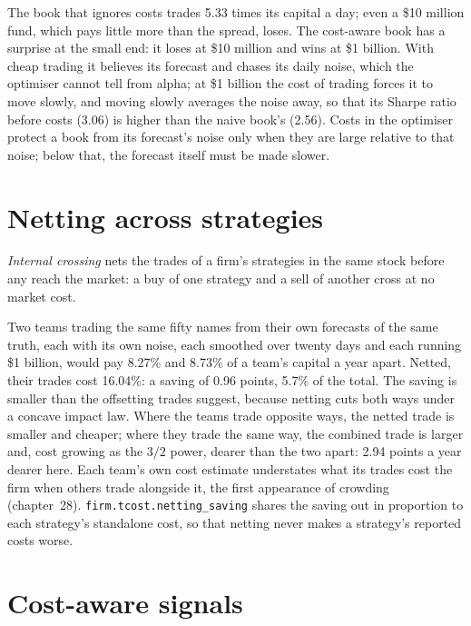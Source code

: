 The book that ignores costs trades 5.33 times its capital a day; even a \$10 million fund, which pays little more than the spread, loses. The cost-aware book has
a surprise at the small end: it loses at \$10 million and wins at \$1 billion. With cheap trading it believes its forecast and chases its daily noise, which the
optimiser cannot tell from alpha; at \$1 billion the cost of trading forces it to move slowly, and moving slowly averages the noise away, so that its Sharpe ratio
before costs (3.06) is higher than the naive book's (2.56). Costs in the optimiser protect a book from its forecast's noise only when they are large relative to
that noise; below that, the forecast itself must be made slower.

\section{Netting across strategies}

\begin{definition}\label{def:rs:transaction-costs-in-research:crossing}
\emph{Internal crossing} nets the trades of a firm's strategies in the same stock before any reach the market: a buy of one strategy and
a sell of another cross at no market cost.
\end{definition}

Two teams trading the same fifty names from their own forecasts of the same truth, each with its own noise, each smoothed over twenty days and each running
\$1 billion, would pay 8.27\% and 8.73\% of a team's capital a year apart. Netted, their trades cost 16.04\%: a saving of 0.96 points, 5.7\% of the total. The saving
is smaller than the offsetting trades suggest, because netting cuts both ways under a concave impact law. Where the teams trade opposite ways, the netted trade is
smaller and cheaper; where they trade the same way, the combined trade is larger and, cost growing as the $3/2$ power, dearer than the two apart: 2.94 points a year
dearer here. Each team's own cost estimate understates what its trades cost the firm when others trade alongside it, the first appearance of crowding (chapter~28).
\texttt{firm.tcost.netting\_saving} shares the saving out in proportion to each strategy's standalone cost, so that netting never makes a strategy's reported costs
worse.

\section{Cost-aware signals}

